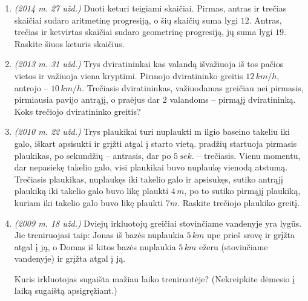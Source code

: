 \documentclass[a4paper]{article}
\begin{document}
\begin{enumerate}
      \item \textit{(2014 m. 27 užd.)} Duoti keturi teigiami skaičiai. Pirmas, antras ir trečias skaičiai sudaro aritmetinę progresiją, o
            šių skaičių suma lygi $12$. Antras, trečias ir ketvirtas skaičiai sudaro geometrinę progresiją, jų suma lygi $19$. Raskite šiuos keturis skaičius.

      \item \textit{(2013 m. 31 užd.)} Trys dviratininkai kas valandą išvažiuoja iš tos pačios vietos ir važiuoja viena kryptimi.
      Pirmojo dviratininko greitis $12\, km/h$, antrojo – $10\, km/h$. Trečiasis dviratininkas, važiuodamas greičiau nei pirmasis, pirmiausia pavijo antrąjį, o praėjus dar $2$ valandoms – pirmąjį
      dviratininką. Koks trečiojo dviratininko greitis?

      \item \textit{(2010 m. 22 užd.)} Trys plaukikai turi nuplaukti m ilgio baseino takeliu iki galo, iškart apsisukti ir grįžti atgal į starto vietą.
      pradžių startuoja pirmasis plaukikas, po sekundžių – antrasis, dar po $5\,sek.$ – trečiasis. Vienu momentu, dar nepasiekę takelio galo, visi plaukikai buvo nuplaukę vienodą atstumą. Trečiasis plaukikas, nuplaukęs iki takelio
      galo ir apsisukęs, sutiko antrąjį plaukiką iki takelio galo buvo likę plaukti $4\,m$, po to sutiko pirmąjį plaukiką, kuriam iki takelio galo buvo likę
      plaukti $7m$. Raskite trečiojo plaukiko greitį.

      \item \textit{(2009 m. 18 užd.)} Dviejų irkluotojų greičiai stovinčiame vandenyje yra lygūs. Jie treniruojasi taip: Jonas iš bazės nuplaukia $5\,km$ upe prieš srovę ir grįžta
      atgal į ją, o Domas iš kitos bazės nuplaukia $5\,km$ ežeru (stovinčiame vandenyje) ir grįžta atgal į ją.

      Kuris irkluotojas sugaišta mažiau laiko treniruotėje? (Nekreipkite dėmesio į
      laiką sugaištą apsigręžiant.)




\end{enumerate}

\end{document}
